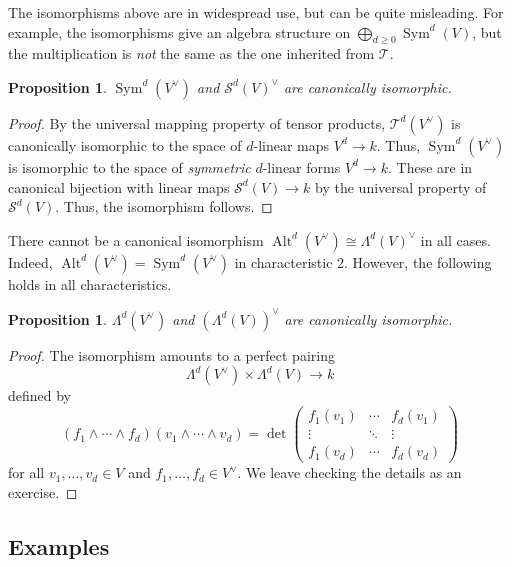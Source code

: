 \documentclass[12pt]{article}
\theoremstyle{plain}
\newtheorem{proposition}[theorem]{Proposition}
\theoremstyle{definition}
\theoremstyle{remark}
\numberwithin{equation}{section}
\begin{document}
The isomorphisms above are in widespread use, but can be quite
misleading.  For example, the isomorphisms give an
algebra structure on $\bigoplus_{d\ge 0}\operatorname{Sym}^d(V)$,
but the multiplication is \emph{not} the same as the one inherited from
$\mathcal{T}$.

\begin{proposition}
$\operatorname{Sym}^d(V^\vee)$ and $\mathcal{S}^d(V)^\vee$
are canonically isomorphic.
\end{proposition}

\begin{proof}
By the universal mapping property of tensor products,
$\mathcal{T}^d(V^\vee)$ is canonically isomorphic to the space of
$d$-linear maps $V^d \to k$.
Thus, $\operatorname{Sym}^d(V^\vee)$ is isomorphic to the
space of \emph{symmetric} $d$-linear forms $V^d \to k$.
These are in canonical bijection with linear maps
$\mathcal{S}^d(V) \to k$ by the universal property of
$\mathcal{S}^d(V)$.  Thus, the isomorphism follows.
\end{proof}

There cannot be a canonical isomorphism
$\operatorname{Alt}^d(V^\vee) \cong \Lambda^d(V)^\vee$
in all cases.  Indeed,
$\operatorname{Alt}^d(V^\vee) = \operatorname{Sym}^d(V^\vee)$
in characteristic $2$.
However, the following holds in all characteristics.

\begin{proposition}
$\Lambda^d(V^\vee)$ and $\left(\Lambda^d(V)\right)^\vee$
are canonically isomorphic.
\end{proposition}

\begin{proof}
The isomorphism amounts to a perfect pairing
\[
\Lambda^d(V^\vee) \times \Lambda^d(V) \to k
\]
defined by
\[
(f_1 \wedge \cdots \wedge f_d)(v_1 \wedge \cdots \wedge v_d)
= \det \begin{pmatrix}
f_1(v_1) & \cdots & f_d(v_1)\\
\vdots & \ddots & \vdots\\
f_1(v_d) & \cdots & f_d(v_d)
\end{pmatrix} 
\]
for all $v_1,\ldots, v_d \in V$ and $f_1,\ldots, f_d \in V^\vee$.
We leave checking the details as an exercise.
\end{proof}

\subsection{Examples}
\end{document}
